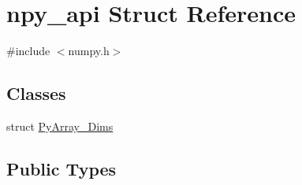 \hypertarget{structnpy__api}{}\section{npy\+\_\+api Struct Reference}
\label{structnpy__api}


{\ttfamily \#include $<$numpy.\+h$>$}

\subsection*{Classes}
\begin{DoxyCompactItemize}
\item 
struct \mbox{\hyperlink{structnpy__api_1_1_py_array___dims}{Py\+Array\+\_\+\+Dims}}
\end{DoxyCompactItemize}
\subsection*{Public Types}
